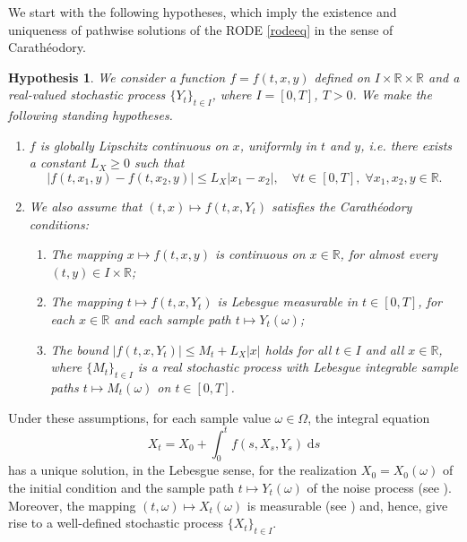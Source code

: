 \documentclass[reqno,12pt]{amsart}
\theoremstyle{plain}%
\newtheorem{stdhyp}{Hypothesis}[section]
\theoremstyle{definition}
\begin{document}
We start with the following hypotheses, which imply the existence and uniqueness of pathwise solutions of the RODE \eqref{rodeeq} in the sense of Carath\'eodory.

\begin{stdhyp}
    \label{standinghypotheses1}
    We consider a function $f=f(t, x, y)$ defined on $I\times \mathbb{R}\times\mathbb{R}$ and a real-valued stochastic process $\{Y_t\}_{t\in I}$, where $I=[0, T]$, $T > 0$. We make the following standing hypotheses.
    \begin{enumerate}
        \item \label{standinghypotheses1Lx} $f$ is globally Lipschitz continuous on $x$, uniformly in $t$ and $y$, i.e. there exists a constant $L_X \geq 0$ such that
            \begin{equation}
                \label{Lxassumptionbasic}
                |f(t, x_1, y) - f(t, x_2, y)| \leq L_X |x_1 - x_2|, \quad \forall t \in [0, T], \;\forall x_1, x_2, y\in\mathbb{R}.
            \end{equation}

        \item \label{standinghypotheses1Car} We also assume that $(t, x) \mapsto f(t, x, Y_t)$ satisfies the Carath\'eodory conditions:
            \begin{enumerate}
                \item The mapping $x \mapsto f(t, x, y)$ is continuous on $x\in \mathbb{R}$, for almost every $(t, y)\in I\times \mathbb{R}$;
                \item The mapping $t \mapsto f(t, x, Y_t)$ is Lebesgue measurable in $t\in [0, T]$, for each $x\in \mathbb{R}$ and each sample path $t \mapsto Y_t(\omega)$;
                \item The bound $|f(t, x, Y_t)| \leq M_t + L_X|x|$ holds for all $t\in I$ and all $x\in\mathbb{R}$, where $\{M_t\}_{t\in I}$ is a real stochastic process with Lebesgue integrable sample paths $t\mapsto M_t(\omega)$ on $t\in [0, T]$.
            \end{enumerate}
    \end{enumerate}
\end{stdhyp}

Under these assumptions, for each sample value $\omega\in\Omega$, the integral equation
\begin{equation}
    \label{integralrodeform}
    X_t = X_0 + \int_0^t f(s, X_s, Y_s) \;\mathrm{d}s
\end{equation}
has a unique solution, in the Lebesgue sense, for the realization $X_0 = X_0(\omega)$ of the initial condition and the sample path $t\mapsto Y_t(\omega)$ of the noise process (see \cite[Theorem 1.1]{CoddingtonLevinson1985}). Moreover, the mapping $(t, \omega) \mapsto X_t(\omega)$ is measurable (see \cite[Section 2.1.2]{HanKloeden2017}) and, hence, give rise to a well-defined stochastic process $\{X_t\}_{t\in I}$.
\end{document}
